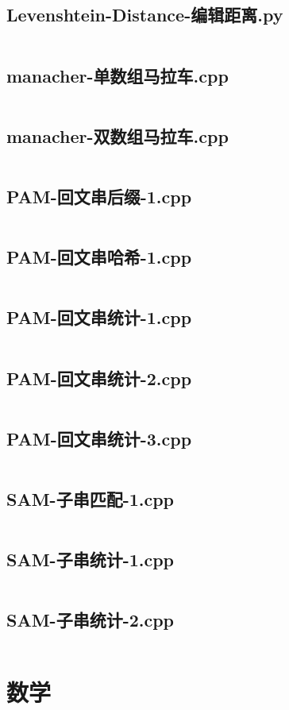 \documentclass[a4paper,landscape,twocolumn]{article} %
\begin{document}
\subsection{Levenshtein-Distance-编辑距离.py}
\inputminted{python}{./codes/019}
\subsection{manacher-单数组马拉车.cpp}
\inputminted{c++}{./codes/020}
\subsection{manacher-双数组马拉车.cpp}
\inputminted{c++}{./codes/021}
\subsection{PAM-回文串后缀-1.cpp}
\inputminted{c++}{./codes/022}
\subsection{PAM-回文串哈希-1.cpp}
\inputminted{c++}{./codes/023}
\subsection{PAM-回文串统计-1.cpp}
\inputminted{c++}{./codes/024}
\subsection{PAM-回文串统计-2.cpp}
\inputminted{c++}{./codes/025}
\subsection{PAM-回文串统计-3.cpp}
\inputminted{c++}{./codes/026}
\subsection{SAM-子串匹配-1.cpp}
\inputminted{c++}{./codes/027}
\subsection{SAM-子串统计-1.cpp}
\inputminted{c++}{./codes/028}
\subsection{SAM-子串统计-2.cpp}
\inputminted{c++}{./codes/029}
\section{数学}
\end{document}
